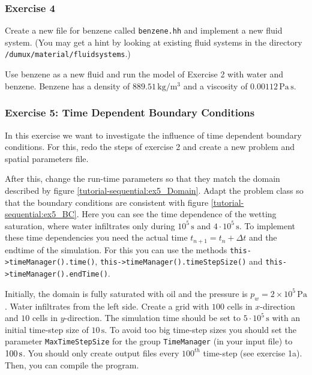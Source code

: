 \subsubsection{Exercise 4}
Create a new file for benzene called \texttt{benzene.hh} and implement
a new fluid system. (You may get a hint by looking at existing fluid
systems in the directory \verb+/dumux/material/fluidsystems+.)

Use benzene as a new fluid and run the model of Exercise 2 with water
and benzene. Benzene has a density of $889.51 \, \text{kg} / \text{m}^3$
and a viscosity of $0.00112 \, \text{Pa} \, \text{s}$.

\subsubsection{Exercise 5: Time Dependent Boundary Conditions}
In this exercise we want to investigate the influence of time dependent boundary
conditions. For this, redo the steps of exercise 2 and create a new problem and
spatial parameters file.

After this, change the run-time parameters so that they match the
domain described by figure \ref{tutorial-sequential:ex5_Domain}. Adapt
the problem class so that the boundary conditions are consistent with
figure \ref{tutorial-sequential:ex5_BC}. Here you can see the time dependence of
the wetting saturation, where water infiltrates only during $10^5\,\text{s}$ and
$4 \cdot 10^5\,\text{s}$. To implement these time dependencies you need the actual
time $t_{n+1}=t_n + \Delta t$ and the endtime of the simulation. For this you can
use the methods \texttt{this->timeManager().time()}, \texttt{this->timeManager().timeStepSize()}
and \texttt{this->timeManager().endTime()}.

Initially, the domain is fully saturated with oil and the pressure is $p_w = 2 \times
10^5\,\text{Pa}$.  Water infiltrates from the left side. Create a grid
with $100$ cells in $x$-direction and $10$ cells in $y$-direction. The
simulation time should be set to $5 \cdot 10^5\,\text{s}$ with an
initial time-step size of $10\,\text{s}$. To avoid too big time-step sizes you
should set the parameter \texttt{MaxTimeStepSize} for the group \texttt{TimeManager}
(in your input file) to $\unit[100]{s}$. You should only create output files
every $100^{th}$ time-step (see exercise 1a). Then, you can compile the program.

